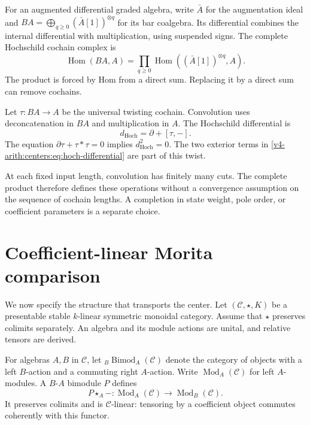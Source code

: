 For an augmented differential graded algebra, write
$\bar A$ for the augmentation ideal and
$BA=\bigoplus_{q\geq0}(\bar A[1])^{\otimes q}$ for its bar
coalgebra. Its differential combines the internal
differential with multiplication, using suspended signs.
The complete Hochschild cochain complex is
\begin{equation}\label{v4-arith:centers:eq:complete}
 \operatorname{Hom}(BA,A)
 =\prod_{q\geq0}\operatorname{Hom}((\bar A[1])^{\otimes q},A).
\end{equation}
The product is forced by Hom from a direct sum.
Replacing it by a direct sum can remove cochains.

Let $\tau:BA\to A$ be the universal twisting cochain.
Convolution uses deconcatenation in $BA$ and multiplication
in $A$. The Hochschild differential is
\begin{equation}\label{v4-arith:centers:eq:twist}
 d_{\mathrm{Hoch}}=\partial+[\tau,-].
\end{equation}
The equation $\partial\tau+\tau\ast\tau=0$ implies
$d_{\mathrm{Hoch}}^2=0$. The two exterior terms in
\eqref{v4-arith:centers:eq:hoch-differential} are part of
this twist.

At each fixed input length, convolution has finitely many
cuts. The complete product therefore defines these
operations without a convergence assumption on the
sequence of cochain lengths. A completion in state weight,
pole order, or coefficient parameters is a separate
choice.

\section{Coefficient-linear Morita comparison}
\label{v4-arith:centers:sec:morita}

We now specify the structure that transports the center.
Let $(\mathcal C,\star,K)$ be a presentable stable
$k$-linear symmetric monoidal category. Assume that $\star$
preserves colimits separately. An algebra and its module
actions are unital, and relative tensors are derived.

For algebras $A,B$ in $\mathcal C$, let
$\!{}_B\operatorname{Bimod}_A(\mathcal C)$ denote the
category of objects with a left $B$-action and a commuting
right $A$-action. Write $\operatorname{Mod}_A(\mathcal C)$
for left $A$-modules. A $B$-$A$ bimodule $P$ defines
\[
 P\star_A-:
 \operatorname{Mod}_A(\mathcal C)\longrightarrow
 \operatorname{Mod}_B(\mathcal C).
\]
It preserves colimits and is $\mathcal C$-linear: tensoring
by a coefficient object commutes coherently with this
functor.

